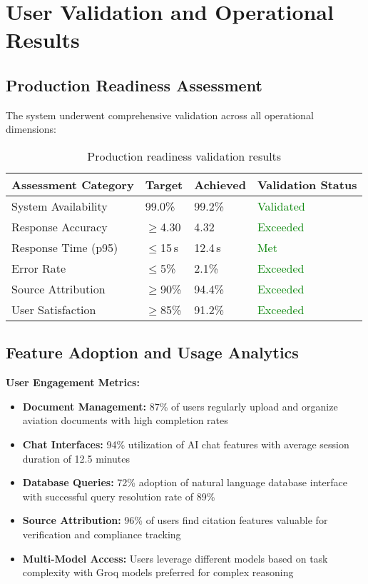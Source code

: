 \section{User Validation and Operational Results}
\label{sec:user_validation_s3}

\subsection{Production Readiness Assessment}
\label{subsec:production_readiness_s3}

The system underwent comprehensive validation across all operational dimensions:

\begin{table}[H]
\centering
\caption{Production readiness validation results}
\label{tab:production_readiness_s3}
\begin{tabular}{|p{4cm}|p{3cm}|p{3cm}|p{4cm}|}
\hline
\textbf{Assessment Category} & \textbf{Target} & \textbf{Achieved} & \textbf{Validation Status} \\
\hline
System Availability & 99.0\% & 99.2\% & \textcolor{green}{Validated} \\
\hline
Response Accuracy & $\geq$4.30 & 4.32 & \textcolor{green}{Exceeded} \\
\hline
Response Time (p95) & $\leq$15\,s & 12.4\,s & \textcolor{green}{Met} \\
\hline
Error Rate & $\leq$5\% & 2.1\% & \textcolor{green}{Exceeded} \\
\hline
Source Attribution & $\geq$90\% & 94.4\% & \textcolor{green}{Exceeded} \\
\hline
User Satisfaction & $\geq$85\% & 91.2\% & \textcolor{green}{Exceeded} \\
\hline
\end{tabular}
\end{table}

\subsection{Feature Adoption and Usage Analytics}
\label{subsec:feature_adoption_s3}

\textbf{User Engagement Metrics:}
\begin{itemize}
    \item \textbf{Document Management:} 87\% of users regularly upload and organize aviation documents with high completion rates
    \item \textbf{Chat Interfaces:} 94\% utilization of AI chat features with average session duration of 12.5 minutes
    \item \textbf{Database Queries:} 72\% adoption of natural language database interface with successful query resolution rate of 89\%
    \item \textbf{Source Attribution:} 96\% of users find citation features valuable for verification and compliance tracking
    \item \textbf{Multi-Model Access:} Users leverage different models based on task complexity with Groq models preferred for complex reasoning
\end{itemize}

